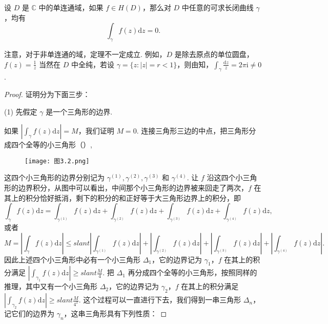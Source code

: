 \documentclass[../../main.tex]{subfiles}
\begin{document}
\begin{theorem}\label{theorem:Cauchy-Goursat定理(Cauchy积分定理)}
设 \( D \) 是 \( \mathbb{C} \) 中的单连通域，如果 \( f \in H(D) \)，那么对 \( D \) 中任意的可求长闭曲线 \( \gamma \)，均有
\[
\int_\gamma f(z)\mathrm{d}z = 0.
\]
\end{theorem}
\begin{remark}
注意，对于非单连通的域，定理不一定成立. 例如，\( D \) 是除去原点的单位圆盘，\( f(z) = \frac{1}{z} \) 当然在 \( D \) 中全纯，若设 \( \gamma = \{ z: |z| = r < 1 \} \)，则由知，\( \int_\gamma \frac{\mathrm{d}z}{z} = 2\pi \mathrm{i} \neq 0 \).
\end{remark}
\begin{proof}
证明分为下面三步：

(1) 先假定 \( \gamma \) 是一个三角形的边界.

如果 \( \left| \int_\gamma f(z)\mathrm{d}z \right| = M \)，我们证明 \( M = 0 \). 连接三角形三边的中点，把三角形分成四个全等的小三角形（）,
\begin{figure}[H]
\centering
\texttt{[image: 图3.2.png]}
\caption{}
\label{figure:图3.2}
\end{figure}
这四个小三角形的边界分别记为 \( \gamma^{(1)}, \gamma^{(2)}, \gamma^{(3)} \) 和 \( \gamma^{(4)} \). 让 \( f \) 沿这四个小三角形的边界积分，从图中可以看出，中间那个小三角形的边界被来回走了两次，\( f \) 在其上的积分恰好抵消，剩下的积分的和正好等于大三角形边界上的积分，即
\[
\int_\gamma f(z)\mathrm{d}z = \int_{\gamma^{(1)}} f(z)\mathrm{d}z + \int_{\gamma^{(2)}} f(z)\mathrm{d}z
+ \int_{\gamma^{(3)}} f(z)\mathrm{d}z + \int_{\gamma^{(4)}} f(z)\mathrm{d}z,
\]
或者
\[
M = \left| \int_\gamma f(z)\mathrm{d}z \right|
\leqslant slant \left| \int_{\gamma^{(1)}} f(z)\mathrm{d}z \right| + \left| \int_{\gamma^{(2)}} f(z)\mathrm{d}z \right|
+ \left| \int_{\gamma^{(3)}} f(z)\mathrm{d}z \right| + \left| \int_{\gamma^{(4)}} f(z)\mathrm{d}z \right|.
\]
因此上述四个小三角形中必有一个小三角形 \( \Delta_1 \)，它的边界记为 \( \gamma_1 \)，\( f \) 在其上的积分满足 \( \left| \int_{\gamma_1} f(z)\mathrm{d}z \right| \geqslant slant \frac{M}{4} \). 把 \( \Delta_1 \) 再分成四个全等的小三角形，按照同样的推理，其中又有一个小三角形 \( \Delta_2 \)，它的边界记为 \( \gamma_2 \)，\( f \) 在其上的积分满足 \( \left| \int_{\gamma_2} f(z)\mathrm{d}z \right| \geqslant slant \frac{M}{4^2} \). 这个过程可以一直进行下去，我们得到一串三角形 \( \Delta_n \)，记它们的边界为 \( \gamma_n \)，这串三角形具有下列性质：


\end{proof}
\end{document}
